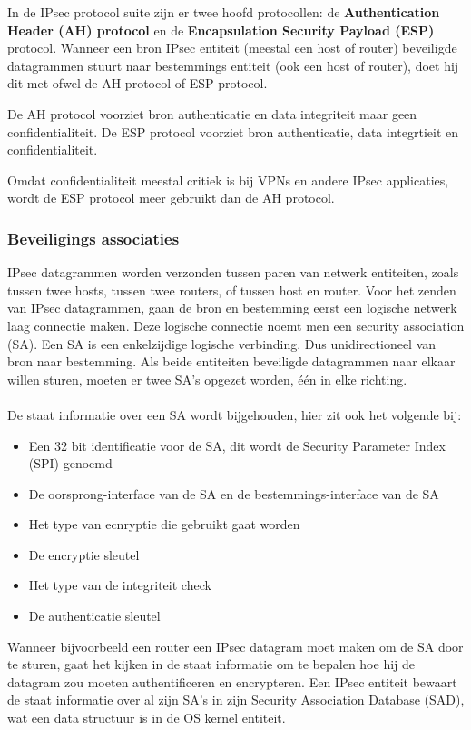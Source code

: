 In de IPsec protocol suite zijn er twee hoofd protocollen: de \textbf{Authentication Header (AH) protocol} en de \textbf{Encapsulation Security Payload (ESP)} protocol. Wanneer een bron IPsec entiteit (meestal een host of router) beveiligde datagrammen stuurt naar bestemmings entiteit (ook een host of router), doet hij dit met ofwel de AH protocol of ESP protocol.

De AH protocol voorziet bron authenticatie en data integriteit maar geen confidentialiteit.
De ESP protocol voorziet bron authenticatie, data integrtieit en confidentialiteit.

Omdat confidentialiteit meestal critiek is bij VPNs en andere IPsec applicaties, wordt de ESP protocol meer gebruikt dan de AH protocol.

\subsubsection{Beveiligings associaties}

IPsec datagrammen worden verzonden tussen paren van netwerk entiteiten, zoals tussen twee hosts, tussen twee routers, of tussen host en router. Voor het zenden van IPsec datagrammen, gaan de bron en bestemming eerst een logische netwerk laag connectie maken. Deze logische connectie noemt men een security association (SA). Een SA is een enkelzijdige logische verbinding. Dus unidirectioneel van bron naar bestemming. Als beide entiteiten beveiligde datagrammen naar elkaar willen sturen, moeten er twee SA’s opgezet worden, één in elke richting.
\\\\
De staat informatie over een SA wordt bijgehouden, hier zit ook het volgende bij:
\begin{itemize}
\item Een 32 bit identificatie voor de SA, dit wordt de Security Parameter Index (SPI) genoemd
\item De oorsprong-interface van de SA en de bestemmings-interface van de SA
\item Het type van ecnryptie die gebruikt gaat worden
\item De encryptie sleutel
\item Het type van de integriteit check
\item De authenticatie sleutel
\end{itemize}
Wanneer bijvoorbeeld een router een IPsec datagram moet maken om de SA door te sturen, gaat het kijken in de staat informatie om te bepalen hoe hij de datagram zou moeten authentificeren en encrypteren.
Een IPsec entiteit bewaart de staat informatie over al zijn SA’s in zijn Security Association Database (SAD), wat een data structuur is in de OS kernel entiteit.

